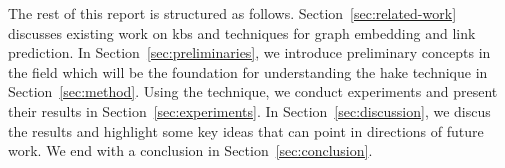 The rest of this report is structured as follows.
Section~\ref{sec:related-work} discusses existing work on \acp{kb} and techniques for graph embedding and link prediction.
In Section~\ref{sec:preliminaries}, we introduce preliminary concepts in the field which will be the foundation for understanding the \ac{hake} technique in Section~\ref{sec:method}.
Using the technique, we conduct experiments and present their results in Section~\ref{sec:experiments}.
In Section~\ref{sec:discussion}, we discus the results and highlight some key ideas that can point in directions of future work.
We end with a conclusion in Section~\ref{sec:conclusion}.
